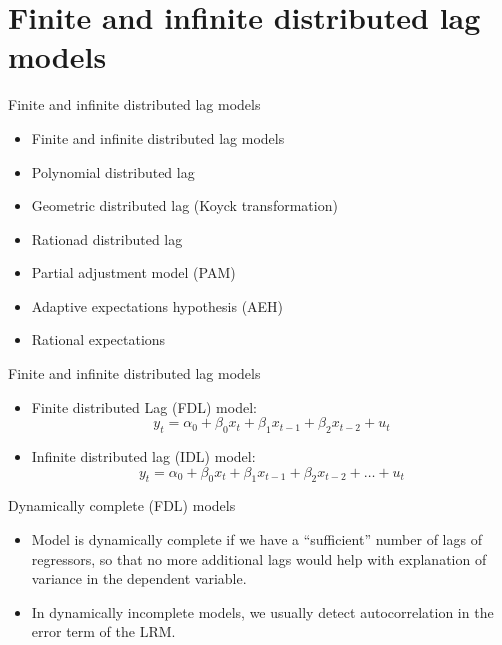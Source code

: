 \documentclass{beamer}
\begin{document}
\section{Finite and infinite distributed lag models}
\begin{frame}{Finite and infinite distributed lag models}
\begin{itemize}
    \item Finite and infinite distributed lag models
    \medskip
    \item Polynomial distributed lag
    \medskip
    \item Geometric distributed lag (Koyck transformation)
    \medskip
    \item Rationad distributed lag
    \medskip
    \item Partial adjustment model (PAM)
    \medskip
    \item Adaptive expectations hypothesis (AEH)
    \medskip
    \item Rational expectations
\end{itemize}
\end{frame}
\begin{frame}{Finite and infinite distributed lag models}
\begin{itemize}
  \item Finite distributed Lag (FDL) model:
  $$ y_t = \alpha_0 + \beta_0 x_t + \beta_1 x_{t-1} + \beta_2 x_{t-2} + u_t $$
  \item Infinite distributed lag (IDL) model:
  $$ y_t = \alpha_0 + \beta_0 x_t + \beta_1 x_{t-1} + \beta_2 x_{t-2} + \dots + u_t $$
  \end{itemize}
Dynamically complete (FDL) models
\vspace{0.5cm}
\begin{itemize}
\item Model is dynamically complete if we have a ``sufficient'' number of lags of regressors, so that no more additional lags would help with explanation of variance in the dependent variable. 
\smallskip
\item In dynamically incomplete models, we usually detect autocorrelation in the error term of the LRM.
\end{itemize}
\end{frame}
\end{document}

